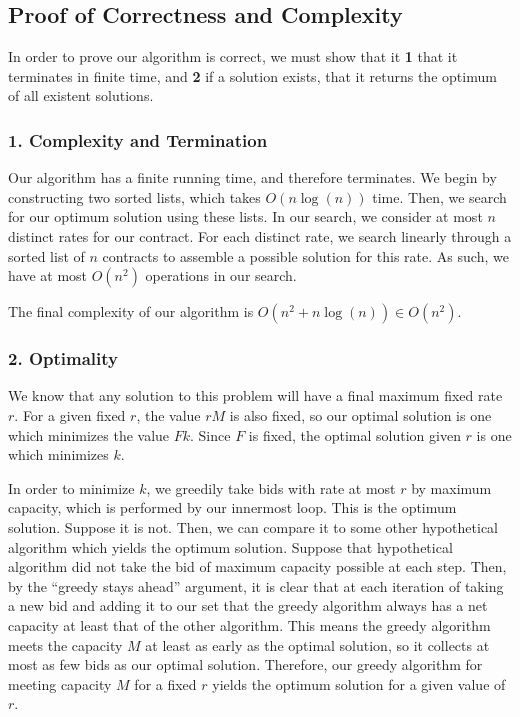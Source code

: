 \documentclass[11pt]{article}
\begin{document}
\subsection*{Proof of Correctness and Complexity}

In order to prove our algorithm is correct, we must show that it \textbf{1} 
that it terminates in finite time, and \textbf{2} if a solution exists, 
that it returns the optimum of all existent solutions.

\subsubsection*{1. Complexity and Termination}

Our algorithm has a finite running time, and therefore terminates. We begin by 
constructing two sorted lists, which takes $O(n \log(n))$ time. Then, we search for
our optimum solution using these lists. 
In our search, we consider at most $n$ distinct rates for our contract. For each distinct rate,
we search linearly through a sorted list of $n$ contracts to assemble a possible solution for
this rate. As such, we have at most $O(n^2)$ operations in our search. 

The final complexity of our algorithm is $O(n^2 + n\log(n)) \in O(n^2)$.

\subsubsection*{2. Optimality}

We know that any solution to this problem will have a final maximum fixed 
rate $r$. For a given fixed $r$, the value $rM$ is also fixed, so our optimal 
solution is one which minimizes the value $Fk$. Since $F$ is fixed, 
the optimal solution given $r$ is one which minimizes $k$.

In order to minimize $k$, we greedily take bids with rate at most $r$ by
maximum capacity, which is performed by our innermost loop.
This is the optimum solution. Suppose it is not. Then,
we can compare it to some other hypothetical algorithm which yields the optimum 
solution. Suppose that hypothetical algorithm did not take the bid of maximum capacity
possible at each step. Then, by the ``greedy stays ahead'' argument, it is
clear that at each iteration of taking a new bid and adding it to our set that
the greedy algorithm always has a net capacity at least that of the other
algorithm. This means the greedy algorithm meets the capacity $M$ at least as 
early as the optimal solution, so it collects at most as few bids as our 
optimal solution. Therefore, our greedy algorithm for meeting capacity $M$ 
for a fixed $r$ yields the optimum solution for a given value of $r$. 
\end{document}
